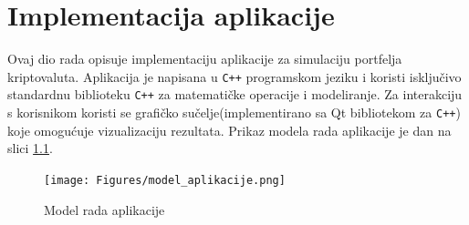 \documentclass[zavrsnirad]{fer}
\begin{document}
\chapter{Implementacija aplikacije}
\label{pog:implementacija}
Ovaj dio rada opisuje implementaciju aplikacije za simulaciju
portfelja kriptovaluta. Aplikacija je napisana u \texttt{C++} programskom
jeziku i koristi isključivo standardnu biblioteku \texttt{C++} za matematičke
operacije i modeliranje. Za interakciju s korisnikom koristi se
grafičko sučelje(implementirano sa Qt bibliotekom za \texttt{C++}) koje
omogućuje vizualizaciju rezultata. Prikaz modela rada aplikacije
je dan na slici \ref{fig:model_aplikacije}.
\\

\begin{figure}[H]
    \centering
    \texttt{[image: Figures/model\_aplikacije.png]}
    \caption{Model rada aplikacije}
    \label{fig:model_aplikacije}
\end{figure}
\end{document}
